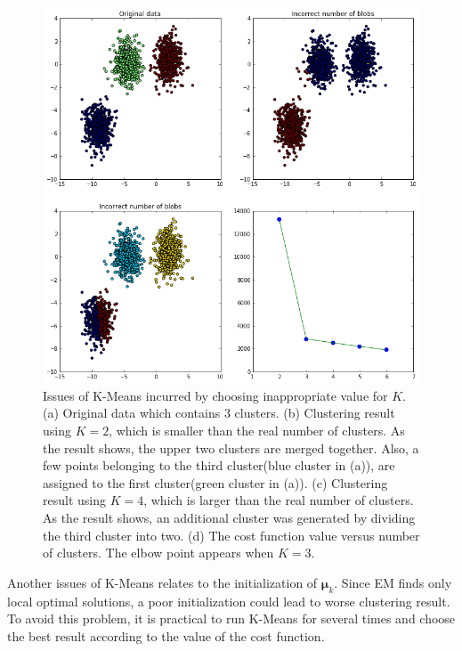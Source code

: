 \begin{figure}
	\begin{center}
		\includegraphics[width=\textwidth]{images/KMeansIncorrectNumber.png}
		\caption{Issues of K-Means incurred by choosing inappropriate value for \(K\). (a) Original data which contains 3 clusters. (b) Clustering result using $K = 2$, which is smaller than the real number of clusters. As the result shows, the upper two clusters are merged together. Also, a few points belonging to the third cluster(blue cluster in (a)), are assigned to the first cluster(green cluster in (a)). (c) Clustering result using $K = 4$, which is larger than the real number of clusters. As the result shows, an additional cluster was generated by dividing the third cluster into two. (d) The cost function value versus number of clusters. The elbow point appears when $K = 3$.}
		\label{fig:KMeansIssue}
	\end{center}
\end{figure}

Another issues of K-Means relates to the initialization of \(\boldsymbol{\mu}_k\). Since EM finds only local optimal solutions, a poor initialization could lead to worse clustering result. To avoid this problem, it is practical to run K-Means for several times and choose the best result according to the value of the cost function.

